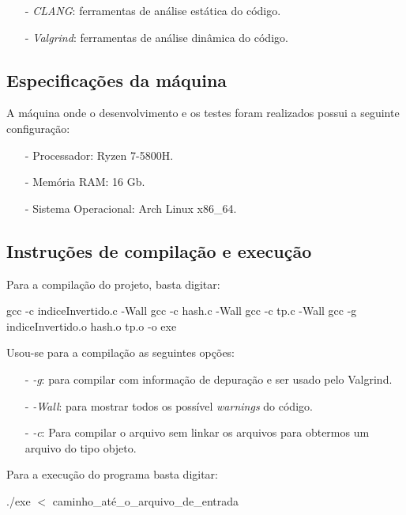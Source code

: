 \documentclass{article}
\begin{document}
\begin{itemize}
    \item[-] \textit{CLANG}: ferramentas de análise estática do código.
    \item[-] \textit{Valgrind}: ferramentas de análise dinâmica do código.
\end{itemize}

\subsection{Especificações da máquina}
A máquina onde o desenvolvimento e os testes foram realizados possui a seguinte configuração:

\begin{itemize}
    \item[-] Processador: Ryzen 7-5800H.
    \item[-] Memória RAM: 16 Gb.
    \item[-] Sistema Operacional: Arch Linux x86\_64.
\end{itemize}


\subsection{Instruções de compilação e execução}

Para a compilação do projeto, basta digitar:

\begin{tcolorbox}[title=Compilando o projeto,width=\linewidth]
    gcc -c indiceInvertido.c -Wall \newline
    gcc -c hash.c -Wall \newline
    gcc -c tp.c -Wall \newline
    gcc  -g indiceInvertido.o hash.o tp.o -o exe
\end{tcolorbox}

Usou-se para a compilação as seguintes opções:

\begin{itemize}
    \item [-] \emph{-g}: para compilar com informação de depuração e ser usado pelo Valgrind.
    \item [-] \emph{-Wall}: para mostrar todos os possível \emph{warnings} do código.
    \item [-] \emph{-c}: Para compilar o arquivo sem linkar os arquivos para obtermos um arquivo do tipo objeto.
\end{itemize}

Para a execução do programa basta digitar:
\begin{tcolorbox}[title=,width=\linewidth]
    ./exe $<$ caminho\_até\_o\_arquivo\_de\_entrada
\end{tcolorbox}
\end{document}
